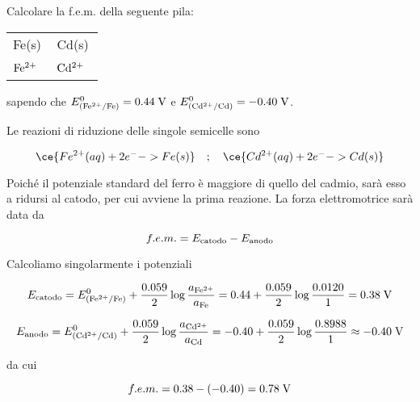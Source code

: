 \begin{esercizio}
    Calcolare la f.e.m. della seguente pila:

\begin{center}
    \begin{tabular}{|p{3.7cm}||p{3.7cm}|}
         Fe(s) & Cd(s)\\[0.5ex]
         $\rm Fe^{2+}$ \, \big[0.0120 M\big] & $\rm Cd^{2+}$ \, \big[0.8988 M\big] \\[0.5ex]
    \end{tabular}
\end{center}

sapendo che $E^0_{(\rm Fe^{2+}/Fe)}=0.44 \; \rm V$ e $E^0_{(\rm Cd^{2+}/Cd)}=-0.40 \; \rm V$.
\end{esercizio}
\begin{soluzione}
    Le reazioni di riduzione delle singole semicelle sono

$$\ce{Fe^{2+}(aq) + 2 e^- -> Fe(s)}
\quad;\quad
\ce{Cd^{2+}(aq) + 2 e^- -> Cd(s)}$$

Poiché il potenziale standard del ferro è maggiore di quello del cadmio, sarà esso a ridursi al catodo, per cui avviene la prima reazione. La forza elettromotrice sarà data da

$$f.e.m. = E_{\rm catodo} - E_{\rm anodo}$$

Calcoliamo singolarmente i potenziali

$$E_{\rm catodo}
=E^0_{(\rm Fe^{2+}/Fe)} + \frac{0.059}{2} \log \frac{a_{\rm Fe^{2+}}}{a_{\rm Fe}}
=0.44 + \frac{0.059}{2} \log \frac{0.0120}{1}
=0.38 \; \rm V$$

$$E_{\rm anodo} = E^0_{(\rm Cd^{2+}/Cd)} + \frac{0.059}{2} \log \frac{a_{\rm Cd^{2+}}}{a_{\rm Cd}}
=-0.40 + \frac{0.059}{2} \log \frac{0.8988}{1}
\approx -0.40 \; \rm V$$

da cui

$$f.e.m.=0.38 - (-0.40) = 0.78 \; \rm V$$
\end{soluzione}

\newpage

